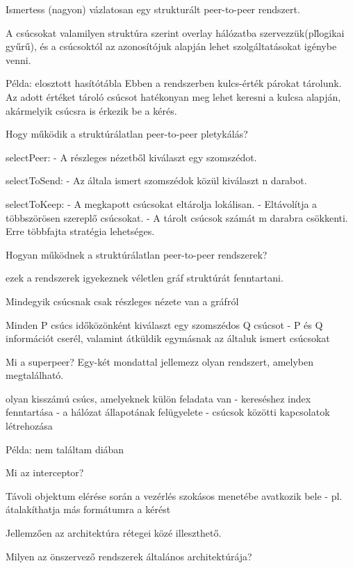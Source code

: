 \documentclass[12pt]{article}
\begin{document}
\begin{description}
    \item  Ismertess (nagyon) vázlatosan egy strukturált peer-to-peer rendszert.
    \item A csúcsokat valamilyen struktúra szerint overlay hálózatba
        szervezzük(pl\. logikai gyűrű),
        és a csúcsoktól az azonosítójuk alapján lehet szolgáltatásokat igénybe venni.
    \item Példa: elosztott hasítótábla Ebben a rendszerben kulcs-érték párokat tárolunk.
        Az adott értéket tároló csúcsot hatékonyan meg lehet keresni a kulcsa alapján, akármelyik csúcsra
        is érkezik be a kérés.
    \item Hogy működik a struktúrálatlan peer-to-peer pletykálás?
    \item selectPeer:
        - A részleges nézetből kiválaszt egy szomszédot.
    \item selectToSend: 
        - Az általa ismert szomszédok közül kiválaszt n darabot.
    \item selectToKeep:
        - A megkapott csúcsokat eltárolja lokálisan.
        - Eltávolítja a többszörösen szereplő csúcsokat.
        - A tárolt csúcsok számát m darabra csökkenti. Erre többfajta stratégia lehetséges.
    \item Hogyan működnek a struktúrálatlan peer-to-peer rendszerek?
    \item ezek a rendszerek igyekeznek véletlen gráf struktúrát fenntartani.
    \item Mindegyik csúcsnak csak részleges nézete van a gráfról 
    \item Minden P csúcs időközönként kiválaszt egy szomszédos Q csúcsot
        - P és Q információt cserél, valamint átküldik egymásnak az általuk ismert csúcsokat
    \item  Mi a superpeer? Egy-két mondattal jellemezz olyan rendszert, amelyben megtalálható.
    \item olyan kisszámú csúcs, amelyeknek külön feladata van
        - kereséshez index fenntartása
        - a hálózat állapotának felügyelete
        - csúcsok közötti kapcsolatok létrehozása
    \item Példa: nem találtam diában
    \item  Mi az interceptor?
    \item Távoli objektum elérése során a vezérlés szokásos menetébe avatkozik bele
        - pl. átalakíthatja más formátumra a kérést
    \item Jellemzően az architektúra rétegei közé illeszthető.
    \item  Milyen az önszervező rendszerek általános architektúrája?

\end{description}
\end{document}
